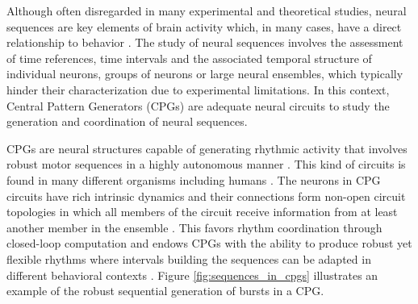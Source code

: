 Although often disregarded in many experimental and theoretical studies, neural sequences are key elements of brain activity which, in many cases, have a direct relationship to behavior \parencite{hahnloser_ultrasparse_2002,venaille_synchronization_2005,buzsaki_space_2018,rabinovich_discrete_2018,paton_neural_2018,elices_robust_2019}.
The study of neural sequences involves the assessment of time references, time intervals and the associated temporal structure of individual neurons, groups of neurons or large neural ensembles, which typically hinder their characterization due to experimental limitations. In this context, Central Pattern Generators (CPGs) are adequate neural circuits to study the generation and coordination of neural sequences. 

CPGs are neural structures capable of generating rhythmic activity that involves robust motor sequences in a highly autonomous manner \parencite{hartline_mottor_1976,selverston_reliable_2000,marder_central_2001}. This kind of circuits is found in many different organisms including humans \parencite{dimitrijevic_evidence_1998,pavlidis_neonatal_2016, arichi_localization_2017}. The neurons in CPG circuits have rich intrinsic dynamics and their connections form non-open circuit topologies in which all members of the circuit receive information from at least another member in the ensemble \parencite{selverston_reliable_2000,huerta_topology_2001}. This favors rhythm coordination through closed-loop computation and endows CPGs with the ability to produce robust yet flexible rhythms where intervals building the sequences can be adapted in different behavioral contexts \parencite{elices_robust_2019}. %
Figure  \ref{fig:sequences_in_cpgs} illustrates an example of the robust sequential generation of bursts in a CPG. 

